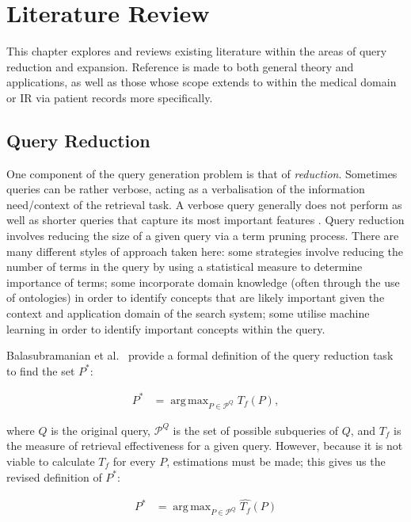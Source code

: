 \documentclass[a4paper]{report}
\DeclareMathOperator*{\argmax}{arg\,max}
\begin{document}
\chapter{Literature Review}
This chapter explores and reviews existing literature within the areas of query reduction and expansion. Reference is made to both general theory and applications, as well as those whose scope extends to within the medical domain or IR via patient records more specifically.

\section{Query Reduction}
One component of the query generation problem is that of \textit{reduction}. Sometimes queries can be rather verbose, acting as a verbalisation of the information need/context of the retrieval task. A verbose query generally does not perform as well as shorter queries that capture its most important features \cite{Balasubramanian:2010:ERL:1835449.1835545}. Query reduction involves reducing the size of a given query via a term pruning process. There are many different styles of approach taken here: some strategies involve reducing the number of terms in the query by using a statistical measure to determine importance of terms; some incorporate domain knowledge (often through the use of ontologies) in order to identify concepts that are likely important given the context and application domain of the search system; some utilise machine learning in order to identify important concepts within the query. 

Balasubramanian et al.~\citep{Balasubramanian:2010:ERL:1835449.1835545} provide a formal definition of the query reduction task to find the set $P^*$:

\begin{equation}
\begin{split}
P^* &= \argmax_{P\in \mathcal{P}^Q} T_f(P),
\end{split}
\end{equation}

where $Q$ is the original query, $\mathcal{P}^Q$ is the set of possible subqueries of $Q$, and $T_f$ is the measure of retrieval effectiveness for a given query. However, because it is not viable to calculate $T_f$ for every $P$, estimations must be made; this gives us the revised definition of $P^*$:

\begin{equation}
\label{QRdefinition-lit}
\begin{split}
P^* &= \argmax_{P\in \mathcal{P}^Q} \widehat{T_f}(P)
\end{split}
\end{equation}
\end{document}
